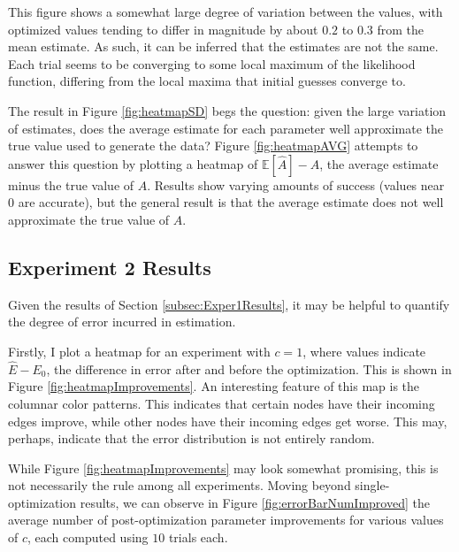 \documentclass[12pt]{article}
\theoremstyle{definition}
\begin{document}
\newpage

This figure shows a somewhat large degree of variation between the values, with optimized values tending to differ in magnitude by about $0.2$ to $0.3$ from the mean estimate. As such, it can be inferred that the estimates are not the same. Each trial seems to be converging to some local maximum of the likelihood function, differing from the local maxima that initial guesses converge to.

The result in Figure \ref{fig:heatmapSD} begs the question: given the large variation of estimates, does the average estimate for each parameter well approximate the true value used to generate the data? Figure \ref{fig:heatmapAVG} attempts to answer this question by plotting a heatmap of $\mathbb{E}[\hat{A}] - A$, the average estimate minus the true value of $A$. Results show varying amounts of success (values near $0$ are accurate), but the general result is that the average estimate does not well approximate the true value of $A$.


\subsection{Experiment 2 Results}
\label{subsec:Exper2Results}

Given the results of Section \ref{subsec:Exper1Results}, it may be helpful to quantify the degree of error incurred in estimation.

Firstly, I plot a heatmap for an experiment with $c=1$, where values indicate $\hat{E} - E_0$, the difference in error after and before the optimization. This is shown in Figure \ref{fig:heatmapImprovements}. An interesting feature of this map is the columnar color patterns. This indicates that certain nodes have their incoming edges improve, while other nodes have their incoming edges get worse. This may, perhaps, indicate that the error distribution is not entirely random.

While Figure \ref{fig:heatmapImprovements} may look somewhat promising, this is not necessarily the rule among all experiments. Moving beyond single-optimization results, we can observe in Figure \ref{fig:errorBarNumImproved} the average number of post-optimization parameter improvements for various values of $c$, each computed using $10$ trials each.

\newpage
\end{document}
